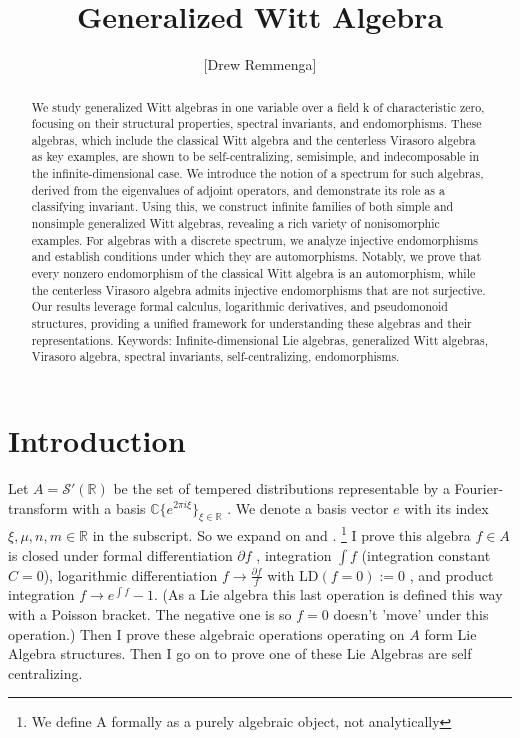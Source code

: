 \documentclass[10pt, oneside]{article}
\title{Generalized Witt Algebra}
\author{[Drew Remmenga]}
\newcommand{\C}{\mathbb{C}}
\newcommand{\R}{\mathbb{R}}
\begin{document}
\nocite{*}

\maketitle
\begin{abstract}
We study generalized Witt algebras in one variable over a field k of characteristic zero, focusing on their structural properties, spectral invariants, and endomorphisms. These algebras, which include the classical Witt algebra and the centerless Virasoro algebra as key examples, are shown to be self-centralizing, semisimple, and indecomposable in the infinite-dimensional case. We introduce the notion of a spectrum for such algebras, derived from the eigenvalues of adjoint operators, and demonstrate its role as a classifying invariant. 
Using this, we construct infinite families of both simple and nonsimple generalized Witt algebras, revealing a rich variety of nonisomorphic examples.
For algebras with a discrete spectrum, we analyze injective endomorphisms and establish conditions under which they are automorphisms. Notably, we prove that every nonzero endomorphism of the classical Witt algebra is an automorphism, while the centerless Virasoro algebra admits injective endomorphisms that are not surjective. Our results leverage formal calculus, logarithmic derivatives, and pseudomonoid structures, providing a unified framework for understanding these algebras and their representations.
Keywords: Infinite-dimensional Lie algebras, generalized Witt algebras, Virasoro algebra, spectral invariants, self-centralizing, endomorphisms.
\end{abstract}
\section{Introduction}
   Let $A=\mathcal{S}'(\R)$ be the set of tempered distributions representable by a Fourier-transform with a basis $\C\{e^{2 \pi i \xi}\}_{\xi \in \R}$ \cite{Hormander1958}. We denote a basis vector $e$ with its index $\xi, \mu, n,m \in \R$ in the subscript. So we expand on \cite{pakianathan2010generalizedwittalgebrasvariable} and \cite{Kac1974}. \footnote{We define A formally as a purely algebraic object, not analytically} 
   I prove this algebra $f \in A$ is closed under formal differentiation $\partial f$ \cite{Dokovic1998}, integration $\int f$ (integration constant $C=0$),
   logarithmic differentiation $f \to \frac{\partial f}{f}$ with $\text{LD}(f=0):=0$ \cite{pakianathan2010generalizedwittalgebrasvariable}, and product integration $f \to e^{\int f} - 1$. (As a Lie algebra this last operation is defined this way with a Poisson bracket. The negative one is so $f=0$ doesn't 'move' under this operation.) 
   Then I prove these algebraic operations operating on $A$ form Lie Algebra structures. 
   Then I go on to prove one of these Lie Algebras are self centralizing.
\end{document}
